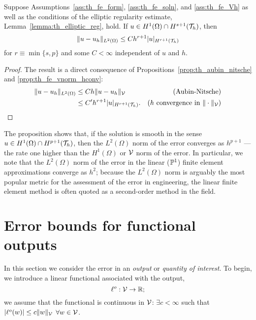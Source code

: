 \begin{proposition}
  Suppose Assumptions~\ref{ass:th_fe_form}, \ref{ass:th_fe_soln}, and \ref{ass:th_fe_Vh} as well as the conditions of the elliptic regularity estimate, Lemma~\ref{lemma:th_elliptic_reg}, hold. If $u \in H^1(\Omega) \cap H^{s+1}(\mathcal{T}_h)$, then
  \begin{equation*}
    \| u - u_h \|_{L^2(\Omega)} \leq C h^{r+1} | u |_{H^{r+1}(\mathcal{T}_h)}
  \end{equation*}
  for $r \equiv \min\{ s,p\}$ and some $C < \infty$ independent of $u$ and $h$.
  \begin{proof}
    The result is a direct consequence of Propositions~\ref{prop:th_aubin_nitsche} and \ref{prop:th_fe_vnorm_hconv}:
    \begin{align*}
      \| u - u_h \|_{L^2(\Omega)}
      &\leq C h \| u-u_h \|_{\mathcal{V}} & \text{(Aubin-Nitsche)} \\
      &\leq C' h^{r+1} | u |_{H^{r+1}(\mathcal{T}_h)} . &\text{($h$ convergence in $\| \cdot \|_{\mathcal{V}}$)} 
    \end{align*}
  \end{proof}
\end{proposition}
The proposition shows that, if the solution is smooth in the sense $u \in H^1(\Omega) \cap H^{p+1}(\mathcal{T}_h)$, then the $L^2(\Omega)$ norm of the error converges as $h^{p+1}$ --- the rate one higher than the $H^1(\Omega)$ or $\mathcal{V}$ norm of the error.  In particular, we note that the $L^2(\Omega)$ norm of the error in the linear ($\mathbb{P}^1$) finite element approximations converge as $h^2$; because the $L^2(\Omega)$ norm is arguably the most popular metric for the assessment of the error in engineering, the linear finite element method is often quoted as a second-order method in the field.

\section{Error bounds for functional outputs}
In this section we consider the error in an \emph{output} or \emph{quantity of interest}. To begin, we introduce a linear functional associated with the output,
\begin{equation*}
  \ell^o : \mathcal{V} \to \mathbb{R};
\end{equation*}
we assume that the functional is continuous in $\mathcal{V}$: $\exists c < \infty$ such that $| \ell^o(w) | \leq c \| w \|_{\mathcal{V}}$ $\forall w \in \mathcal{V}$.

